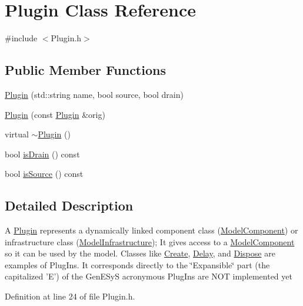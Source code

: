 \hypertarget{class_plugin}{\section{Plugin Class Reference}
\label{class_plugin}
}


{\ttfamily \#include $<$Plugin.\-h$>$}

\subsection*{Public Member Functions}
\begin{DoxyCompactItemize}
\item 
\hyperlink{class_plugin_a1180a8be15f3a920f1044e528d807ea1}{Plugin} (std\-::string name, bool source, bool drain)
\item 
\hyperlink{class_plugin_acececc8908162c6b0c883e62995abad8}{Plugin} (const \hyperlink{class_plugin}{Plugin} \&orig)
\item 
virtual \hyperlink{class_plugin_aee4cc1864a2afa84a9ad935153f3fe39}{$\sim$\-Plugin} ()
\item 
bool \hyperlink{class_plugin_a1f1610d1eee7009dedf030f8495ab748}{is\-Drain} () const 
\item 
bool \hyperlink{class_plugin_a87ed4a6c7eab8e84a650c4e057f15dd1}{is\-Source} () const 
\end{DoxyCompactItemize}


\subsection{Detailed Description}
A \hyperlink{class_plugin}{Plugin} represents a dynamically linked component class (\hyperlink{class_model_component}{Model\-Component}) or infrastructure class (\hyperlink{class_model_infrastructure}{Model\-Infrastructure}); It gives access to a \hyperlink{class_model_component}{Model\-Component} so it can be used by the model. Classes like \hyperlink{class_create}{Create}, \hyperlink{class_delay}{Delay}, and \hyperlink{class_dispose}{Dispose} are examples of Plug\-Ins. It corresponds directly to the \char`\"{}\-Expansible\char`\"{} part (the capitalized 'E') of the Gen\-E\-Sy\-S acronymous Plug\-Ins are N\-O\-T implemented yet 

Definition at line 24 of file Plugin.\-h.



